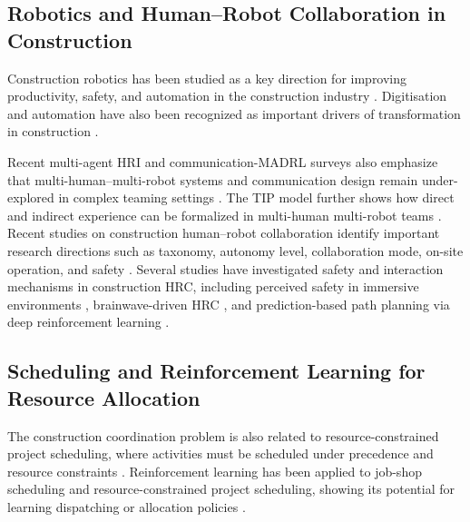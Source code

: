 \documentclass[preprint,12pt]{elsarticle}
\begin{document}
\subsection{Robotics and Human--Robot Collaboration in Construction}

Construction robotics has been studied as a key direction for improving productivity, safety, and automation in the construction industry \cite{Bock2015FutureConstructionAutomation,BockLinner2016ConstructionRobots}. Digitisation and automation have also been recognized as important drivers of transformation in construction \cite{OesterreichTeuteberg2016DigitisationConstruction}.

Recent multi-agent HRI and communication-MADRL surveys also emphasize that multi-human--multi-robot systems and communication design remain under-explored in complex teaming settings \cite{Dahiya2022MultiAgentHRI,Zhu2024CommMADRL}. The TIP model further shows how direct and indirect experience can be formalized in multi-human multi-robot teams \cite{Guo2024TIP}. Recent studies on construction human--robot collaboration identify important research directions such as taxonomy, autonomy level, collaboration mode, on-site operation, and safety \cite{Liang2021HRCConstruction,Zhang2023HRCOnSite,Rodrigues2023HRITaxonomy}. Several studies have investigated safety and interaction mechanisms in construction HRC, including perceived safety in immersive environments \cite{You2018PerceivedSafety}, brainwave-driven HRC \cite{Liu2021BrainwaveHRC}, and prediction-based path planning via deep reinforcement learning \cite{Cai2023PredictionPathPlanning}.

\subsection{Scheduling and Reinforcement Learning for Resource Allocation}

The construction coordination problem is also related to resource-constrained project scheduling, where activities must be scheduled under precedence and resource constraints \cite{KolischHartmann1999RCPSP,Hartmann2000HeuristicsRCPSP,HartmannBriskorn2010RCPSPSurvey}. Reinforcement learning has been applied to job-shop scheduling and resource-constrained project scheduling, showing its potential for learning dispatching or allocation policies \cite{ZhangDietterich1995JobShopRL,Sung2020RLRCPSP,Cai2024DRLRCPSP}.
\end{document}
